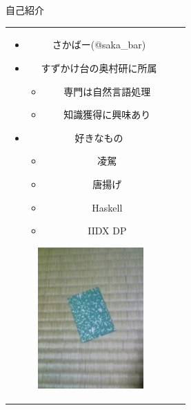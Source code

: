 \begin{frame}{自己紹介}
\begin{tabular}[tb]{cc}

 \begin{minipage}{0.5\hsize}
 \begin{center}
 \begin{itemize}
	\item さかばー(@saka\_bar)
	\item すずかけ台の奥村研に所属
				\begin{itemize}
				 \item 専門は自然言語処理
				 \item 知識獲得に興味あり
				\end{itemize}
	\item 好きなもの
				\begin{itemize}
				 \item 凌駕
				 \item 唐揚げ
				 \item Haskell
				 \item IIDX DP
				\end{itemize}
			 \end{itemize}
 \end{center}
 \end{minipage}

 \begin{minipage}{0.5\hsize}
 \begin{center}
 			 \begin{figure}[htbp]
				\includegraphics[bb=0 0 135 180,width=4.05cm,height=5.40cm]{./figure/icon.jpg}
				 \end{figure}
 \end{center}
 \end{minipage}
\end{tabular}



\end{frame}
